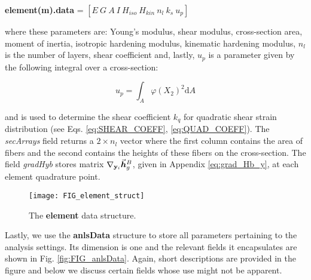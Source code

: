 \begin{appendices}
\begin{center}
	\textbf{element(m).data} = $[E\ G\ A\ I\ H_{iso}\ H_{kin}\ n_l\ k_s\ u_p]$
\end{center}
	
	\noindent where these parameters are: Young's modulus, shear modulus, 
	cross-section area, moment of inertia, isotropic hardening modulus, 
	kinematic 
	hardening modulus, $n_l$ is the number of layers, shear coefficient and, 
	lastly, $u_p$ is a 
	parameter given by the following integral over a cross-section:
	
	$$ u_p = \int_A \varphi(X_2)^2\text{d}A $$
	
	\noindent and is used to determine the shear coefficient $k_q$ for 
	quadratic 
	shear strain distribution (see Eqs. \ref{eq:SHEAR_COEFF}, 
	\ref{eq:QUAD_COEFF}). The \textit{secArrays} field returns a $2\times n_l$ 
	vector where the first column contains the area of fibers and the second 
	contains the heights of these fibers on the cross-section. The field 
	\textit{gradHyb} stores matrix $\nabla_{\mathbf{y}_i}\vec{\bm{h}}_g^B$, given 
	in Appendix \ref{eq:grad_Hb_y}, at each element quadrature point. 
	
	\begin{figure}
		\centering
		\texttt{[image: FIG\_element\_struct]}
		\caption{The \textbf{element} data structure.}
		\label{fig:FIG_element_struct}
	\end{figure}


Lastly, we use the \textbf{anlsData} structure to store all parameters 
pertaining to the analysis settings. Its dimension is one and the relevant 
fields it encapsulates are shown in Fig. \ref{fig:FIG_anlsData}. Again, short 
descriptions are 
provided in the figure and below we discuss certain fields whose use might not 
be apparent. 


\end{appendices}
